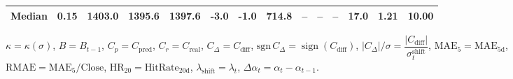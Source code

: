 \begin{threeparttable}
{\begin{tabular}{lrrrrrrrrrrrrr}
 Median &     0.15 & 1403.0 & 1395.6 & 1397.6 &       -3.0 &                     -1.0 &               714.8 &         -- &        -- &             -- &             17.0 &            1.21 &                  10.00 \\
\bottomrule
\end{tabular}
}%
\begin{tablenotes}\footnotesize
\item $\kappa=\kappa(\sigma)$, $B=B_{t-1}$, $C_p=C_{\text{pred}}$, $C_r=C_{\text{real}}$, $C_\Delta=C_{\text{diff}}$, $\mathrm{sgn}\,C_\Delta=\operatorname{sign}(C_{\text{diff}})$, $|C_\Delta|/\sigma=\dfrac{|C_{\text{diff}}|}{\sigma_t^{\text{shift}}}$, $\mathrm{MAE}_5=\mathrm{MAE}_{5\text{d}}$, $\mathrm{RMAE}= \mathrm{MAE}_5 / \text{Close}$, $\mathrm{HR}_{20}=\mathrm{HitRate}_{20\text{d}}$, 
$\lambda_{\text{shift}}=\lambda_t$, 
$\Delta\alpha_t=\alpha_t-\alpha_{t-1}$.
\end{tablenotes}
\end{threeparttable}
\endgroup